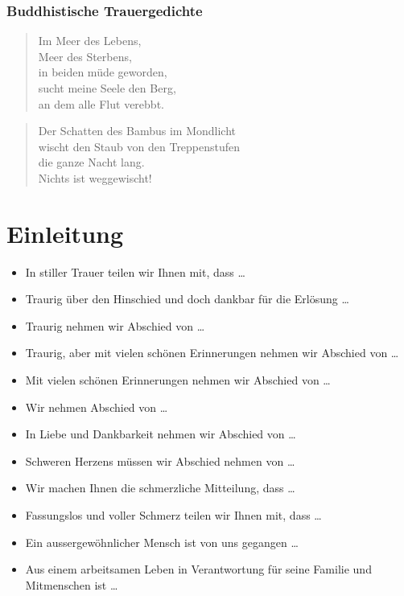 \documentclass[ngerman,a4paper,11pt]{scrreprt}
\begin{document}
\subsubsection*{Buddhistische Trauergedichte}
\label{sec-1-1-1-4-3}

\begin{verse}
Im Meer des Lebens, \\
Meer des Sterbens, \\
in beiden müde geworden, \\
sucht meine Seele den Berg, \\
an dem alle Flut verebbt. \\
\end{verse}

\begin{verse}
Der Schatten des Bambus im Mondlicht \\
wischt den Staub von den Treppenstufen \\
die ganze Nacht lang. \\
Nichts ist weggewischt! \\
\end{verse}

\section{Einleitung}
\label{sec-1-1-2}

\begin{itemize}
\item In stiller Trauer teilen wir Ihnen mit, dass \ldots{}
\item Traurig über den Hinschied und doch dankbar für die Erlösung \ldots{}
\item Traurig nehmen wir Abschied von \ldots{}
\item Traurig, aber mit vielen schönen Erinnerungen nehmen wir Abschied von \ldots{}
\item Mit vielen schönen Erinnerungen nehmen wir Abschied von \ldots{}
\item Wir nehmen Abschied von \ldots{}
\item In Liebe und Dankbarkeit nehmen wir Abschied von \ldots{}
\item Schweren Herzens müssen wir Abschied nehmen von \ldots{}
\item Wir machen Ihnen die schmerzliche Mitteilung, dass \ldots{}
\item Fassungslos und voller Schmerz teilen wir Ihnen mit, dass \ldots{}
\item Ein aussergewöhnlicher Mensch ist von uns gegangen \ldots{}
\item Aus einem arbeitsamen Leben in Verantwortung für seine Familie und
Mitmenschen ist \ldots{}
\end{itemize}
\end{document}
